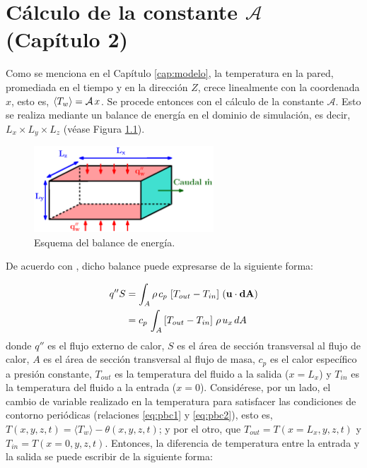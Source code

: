 \chapter{Cálculo de la constante $\mathcal{A}$ (Capítulo 2)} \label{apen:constante-A}

Como se menciona en el Capítulo \ref{cap:modelo}, la temperatura en la pared, promediada en el tiempo y en la dirección $Z$, crece linealmente con la coordenada $x$, esto es, $\langle T_w \rangle = \mathcal{A} \hspace{0.5mm} x $. Se procede entonces con el cálculo de la constante $\mathcal{A}$. Esto se realiza mediante un balance de energía en el dominio de simulación, es decir, $L_x \times L_y \times L_z$ (véase Figura \ref{fig:apendice-b}). 

\begin{figure}[H]
  \centering  
    \includegraphics[width=0.6\textwidth]{figures/apendices/apendice_b.eps}
  \caption{Esquema del balance de energía.}
  \label{fig:apendice-b}
\end{figure}
De acuerdo con \cite{cengelheat}, dicho balance puede expresarse de la siguiente forma:

\begin{align*}
q'' S &= \int_A \rho \hspace{0.5mm} c_p \hspace{0.5mm} \left[ T_{out} - T_{in} \right] \hspace{0.5mm} (\mathbf{u} \cdot \mathbf{dA}) \\
	  &= c_p \hspace{0.5mm} \int_A \left[ T_{out} - T_{in} \right] \hspace{0.5mm} \rho \hspace{0.5mm} u_x \hspace{0.5mm} dA
\end{align*}
donde $q''$ es el flujo externo de calor, $S$ es el área de sección transversal al flujo de calor, $A$ es el área de sección transversal al flujo de masa, $c_p$ es el calor específico a presión constante, $T_{out}$ es la temperatura del fluido a la salida ($x=L_x$) y $T_{in}$ es la temperatura del fluido a la entrada ($x=0$). Considérese, por un lado, el cambio de variable realizado en la temperatura para satisfacer las condiciones de contorno periódicas (relaciones \ref{eq:pbc1} y \ref{eq:pbc2}), esto es, $T(x,y,z,t)= \langle T_w \rangle - \theta(x,y,z,t)$; y por el otro, que $T_{out}=T(x=L_x,y,z,t)$ y $T_{in}=T(x=0,y,z,t)$. Entonces, la diferencia de temperatura entre la entrada y la salida se puede escribir de la siguiente forma:

